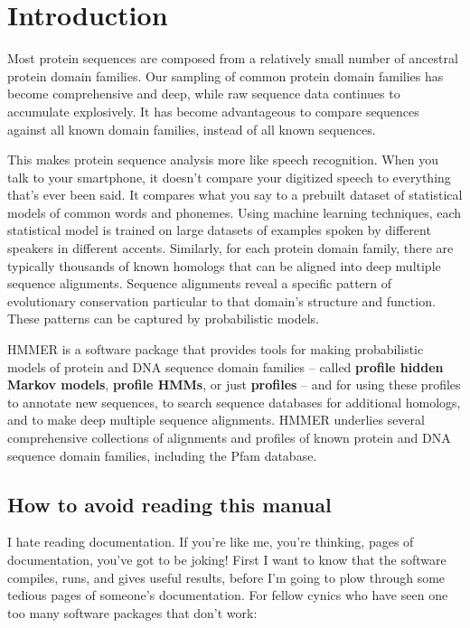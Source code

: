 \newpage
\chapter{Introduction}
\label{chapter:introduction}
\setcounter{footnote}{0}

Most protein sequences are composed from a relatively small number of
ancestral protein domain families. Our sampling of common protein
domain families has become comprehensive and deep, while raw sequence
data continues to accumulate explosively. It has become advantageous
to compare sequences against all known domain families, instead of all
known sequences.

This makes protein sequence analysis more like speech recognition.
When you talk to your smartphone, it doesn't compare your digitized
speech to everything that's ever been said. It compares what you say
to a prebuilt dataset of statistical models of common words and
phonemes.  Using machine learning techniques, each statistical model
is trained on large datasets of examples spoken by different speakers
in different accents. Similarly, for each protein domain family, there
are typically thousands of known homologs that can be aligned into
deep multiple sequence alignments. Sequence alignments reveal a
specific pattern of evolutionary conservation particular to that
domain's structure and function. These patterns can be captured by
probabilistic models.

HMMER is a software package that provides tools for making
probabilistic models of protein and DNA sequence domain families --
called \textbf{profile hidden Markov models}, \textbf{profile HMMs},
or just \textbf{profiles} -- and for using these profiles to annotate
new sequences, to search sequence databases for additional homologs,
and to make deep multiple sequence alignments.  HMMER underlies
several comprehensive collections of alignments and profiles of known
protein and DNA sequence domain families, including the Pfam
database.


\section{How to avoid reading this manual}

I hate reading documentation. If you're like me, you're thinking,
\pageref*{manualend} pages of documentation, you've got to be joking!
First I want to know that the software compiles, runs, and gives
useful results, before I'm going to plow through some
\pageref*{manualend} tedious pages of someone's documentation. For
fellow cynics who have seen one too many software packages that don't
work:

